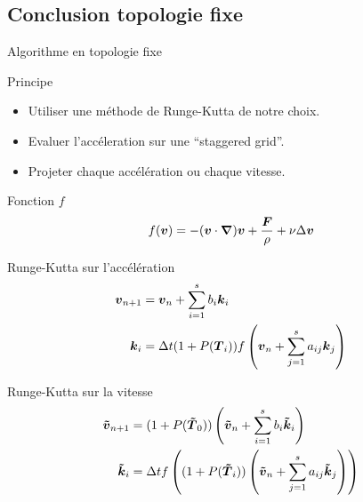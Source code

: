 \subsection{Conclusion topologie fixe}
\begin{frame}[<+->][shrink]{Algorithme en topologie fixe}
 \begin{block}{Principe}
  \begin{itemize}
   \item<1-> Utiliser une méthode de Runge-Kutta de notre choix.
   \item Evaluer l'accéleration sur une ``staggered grid''.
   \item Projeter chaque accélération ou chaque vitesse.
  \end{itemize}
 \end{block}
 \begin{block}{Fonction $f$}
 \vspace{-0.5cm}
 \begin{equation*}
  f({\boldsymbol {v}})=-({\boldsymbol {v}}\cdot{\boldsymbol {\nabla}} ) {\boldsymbol {v}}+\frac{{\boldsymbol {F}}}{\rho}+\nu \Delta {\boldsymbol {v}}
  \end{equation*}
 \end{block}

\begin{block}{Runge-Kutta sur l'accélération}
 \vspace{-0.7cm}
	\begin{align*}
	{\boldsymbol {v}}_{n+1}&={\boldsymbol {v}}_{n}+\sum_{i=1}^{s}b_{i}{\boldsymbol {k}}_{i}\\
	{\boldsymbol {k}}_{i}&=\Delta t (1+P({\boldsymbol {T}}_{i}))f\left({\boldsymbol {v}}_{n}+\sum_{j=1}^{s}a_{ij}{\boldsymbol {k}}_{j}\right)
	\end{align*}
\end{block}
 
\begin{block}{Runge-Kutta sur la vitesse}
 \vspace{-0.5cm}
	\begin{align*}
	{\boldsymbol {\tilde{v}}}_{n+1}&=(1+P({\boldsymbol {\tilde{T}}}_0))\left({\boldsymbol {\tilde{v}}}_{n}+\sum_{i=1}^{s}b_{i}{\boldsymbol {\tilde{k}}}_{i}\right)\\
	{\boldsymbol {\tilde{k}}}_{i}&=\Delta t f\left((1+P({\boldsymbol {\tilde{T}}}_{i}))\left({\boldsymbol {\tilde{v}}}_{n}+\sum_{j=1}^{s}a_{ij}{\boldsymbol {\tilde{k}}}_{j}\right)\right)
	\end{align*}
\end{block}
\end{frame}

